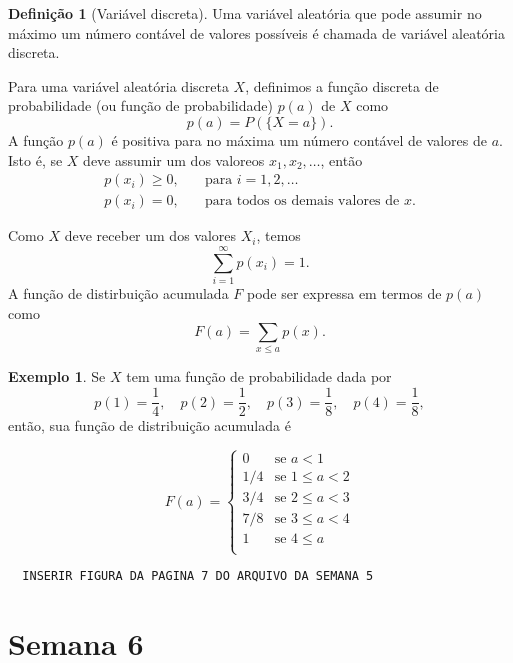 \documentclass[]{book}
\theoremstyle{definition}
\newtheorem{definition}{Definição}[chapter]
\theoremstyle{definition}
\newtheorem{example}{Exemplo}[chapter]
\theoremstyle{definition}
\theoremstyle{remark}
\begin{document}
\begin{definition}[Variável discreta]
\protect\hypertarget{def:defVAdiscreta}{}{\label{def:defVAdiscreta} \iffalse (Variável discreta) \fi{} }Uma variável aleatória que pode assumir no máximo um número contável de valores possíveis é chamada de variável aleatória discreta.
\end{definition}

Para uma variável aleatória discreta \(X\), definimos a função discreta de probabilidade (ou função de probabilidade) \(p(a)\) de \(X\) como
\[p(a) = P(\{X=a\}).\]
A função \(p(a)\) é positiva para no máxima um número contável de valores de \(a\).
Isto é, se \(X\) deve assumir um dos valoreos \(x_1, x_2, \ldots\), então
\begin{align}
p(x_i) \geq 0, &\quad \text{para } i=1,2,\ldots \\
p(x_i) = 0, &\quad \text{para todos os demais valores de $x$.}
\end{align}

Como \(X\) deve receber um dos valores \(X_i\), temos
\[\sum_{i=1}^{\infty}p(x_i)=1.\]
A função de distirbuição acumulada \(F\) pode ser expressa em termos de \(p(a)\) como
\[F(a) = \sum_{x \leq a}p(x).\]

\begin{example}
\protect\hypertarget{exm:unnamed-chunk-137}{}{\label{exm:unnamed-chunk-137} }Se \(X\) tem uma função de probabilidade dada por
\[p(1) = \frac{1}{4}, \quad p(2) = \frac{1}{2}, \quad p(3) = \frac{1}{8}, \quad p(4) = \frac{1}{8},\]
então, sua função de distribuição acumulada é

\begin{equation}
  F(a) =
    \begin{cases}
      0 & \text{se } a < 1\\
      1/4 & \text{se } 1 \leq a < 2\\
      3/4 & \text{se } 2 \leq a < 3\\
      7/8 & \text{se } 3 \leq a < 4\\
      1 & \text{se } 4 \leq a\\
    \end{cases}       
\end{equation}

\begin{verbatim}
  INSERIR FIGURA DA PAGINA 7 DO ARQUIVO DA SEMANA 5
\end{verbatim}
\end{example}

\hypertarget{sem6}{%
\chapter{Semana 6}\label{sem6}}
\end{document}
